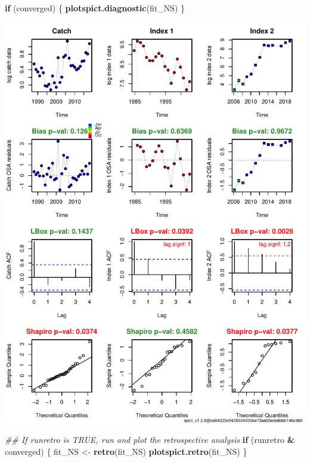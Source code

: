 \documentclass[
]{article}
\newenvironment{Shaded}{\begin{snugshade}}{\end{snugshade}}
\newcommand{\CommentTok}[1]{\textcolor[rgb]{0.56,0.35,0.01}{\textit{#1}}}
\newcommand{\ControlFlowTok}[1]{\textcolor[rgb]{0.13,0.29,0.53}{\textbf{#1}}}
\newcommand{\KeywordTok}[1]{\textcolor[rgb]{0.13,0.29,0.53}{\textbf{#1}}}
\newcommand{\NormalTok}[1]{#1}
\newcommand{\OperatorTok}[1]{\textcolor[rgb]{0.81,0.36,0.00}{\textbf{#1}}}
\newcommand{\StringTok}[1]{\textcolor[rgb]{0.31,0.60,0.02}{#1}}
\begin{document}
\begin{Shaded}
\begin{Highlighting}[]
\ControlFlowTok{if}\NormalTok{ (converged) \{}
  \KeywordTok{plotspict.diagnostic}\NormalTok{(fit_NS)}
\NormalTok{\}}
\end{Highlighting}
\end{Shaded}

\includegraphics{aru.27.123a4_SPiCT_WD_files/figure-latex/diagnostics_scenario_1-1.pdf}

\begin{Shaded}
\begin{Highlighting}[]
  \CommentTok{## If runretro is TRUE, run and plot the retrospective analysis}
  \ControlFlowTok{if}\NormalTok{ (runretro }\OperatorTok{&}\StringTok{ }\NormalTok{converged) \{}
\NormalTok{    fit_NS <-}\StringTok{ }\KeywordTok{retro}\NormalTok{(fit_NS)}
    \KeywordTok{plotspict.retro}\NormalTok{(fit_NS)}
\NormalTok{  \}}
\end{Highlighting}
\end{Shaded}
\end{document}
